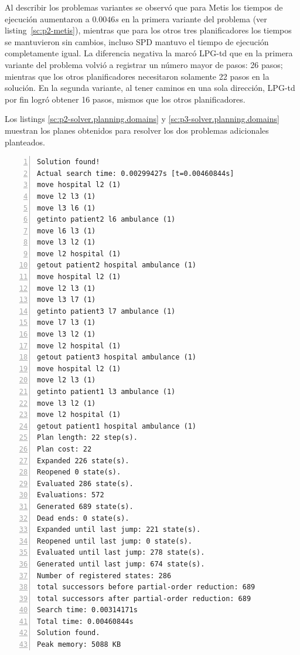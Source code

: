 \documentclass[a4paper,12pt,twocolumn]{article}
\begin{document}
Al describir los problemas variantes se observó que para Metis los tiempos de ejecución aumentaron a $0.0046 s$ en la primera variante del problema (ver listing~\ref{sc:p2-metis}), mientras que para los otros tres planificadores los tiempos se mantuvieron sin cambios, incluso SPD mantuvo el tiempo de ejecución completamente igual. La diferencia negativa la marcó LPG-td que en la primera variante del problema volvió a registrar un número mayor de pasos: 26 pasos; mientras que los otros planificadores necesitaron solamente 22 pasos en la solución. En la segunda variante, al tener caminos en una sola dirección, LPG-td por fin logró obtener 16 pasos, mismos que los otros planificadores.

Los listings \ref{sc:p2-solver.planning.domains} y \ref{sc:p3-solver.planning.domains} muestran los planes obtenidos para resolver los dos problemas adicionales planteados.


\begin{lstlisting}[style=consola, numbers=left, caption=Plan de la primera variante con Metis \label{sc:p2-metis}]
Solution found!
Actual search time: 0.00299427s [t=0.00460844s]
move hospital l2 (1)
move l2 l3 (1)
move l3 l6 (1)
getinto patient2 l6 ambulance (1)
move l6 l3 (1)
move l3 l2 (1)
move l2 hospital (1)
getout patient2 hospital ambulance (1)
move hospital l2 (1)
move l2 l3 (1)
move l3 l7 (1)
getinto patient3 l7 ambulance (1)
move l7 l3 (1)
move l3 l2 (1)
move l2 hospital (1)
getout patient3 hospital ambulance (1)
move hospital l2 (1)
move l2 l3 (1)
getinto patient1 l3 ambulance (1)
move l3 l2 (1)
move l2 hospital (1)
getout patient1 hospital ambulance (1)
Plan length: 22 step(s).
Plan cost: 22
Expanded 226 state(s).
Reopened 0 state(s).
Evaluated 286 state(s).
Evaluations: 572
Generated 689 state(s).
Dead ends: 0 state(s).
Expanded until last jump: 221 state(s).
Reopened until last jump: 0 state(s).
Evaluated until last jump: 278 state(s).
Generated until last jump: 674 state(s).
Number of registered states: 286
total successors before partial-order reduction: 689
total successors after partial-order reduction: 689
Search time: 0.00314171s
Total time: 0.00460844s
Solution found.
Peak memory: 5088 KB
\end{lstlisting}

\end{document}
